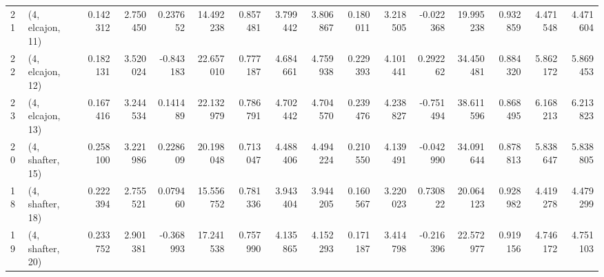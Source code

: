 \begin{tabular}{llrrrrrrrrrrrrrr}
21 &  (4, elcajon, 11) &   0.142312 &  2.750450 &  0.237652 &  14.492238 &  0.857481 &   3.799442 &  3.806867 &  0.180011 &   3.218505 & -0.022368 &   19.995238 &  0.932859 &   4.471548 &   4.471604 \\
22 &  (4, elcajon, 12) &   0.182131 &  3.520024 & -0.843183 &  22.657010 &  0.777187 &   4.684661 &  4.759938 &  0.229393 &   4.101441 &  0.292262 &   34.450481 &  0.884320 &   5.862172 &   5.869453 \\
23 &  (4, elcajon, 13) &   0.167416 &  3.244534 &  0.141489 &  22.132979 &  0.786791 &   4.702442 &  4.704570 &  0.239476 &   4.238827 & -0.751494 &   38.611596 &  0.868495 &   6.168213 &   6.213823 \\
20 &  (4, shafter, 15) &   0.258100 &  3.221986 &  0.228609 &  20.198048 &  0.713047 &   4.488406 &  4.494224 &  0.210550 &   4.139491 & -0.042990 &   34.091644 &  0.878813 &   5.838647 &   5.838805 \\
18 &  (4, shafter, 18) &   0.222394 &  2.755521 &  0.079460 &  15.556752 &  0.781336 &   3.943404 &  3.944205 &  0.160567 &   3.220023 &  0.730822 &   20.064123 &  0.928982 &   4.419278 &   4.479299 \\
19 &  (4, shafter, 20) &   0.233752 &  2.901381 & -0.368993 &  17.241538 &  0.757990 &   4.135865 &  4.152293 &  0.171187 &   3.414798 & -0.216396 &   22.572977 &  0.919156 &   4.746172 &   4.751103 \\
\bottomrule
\end{tabular}
